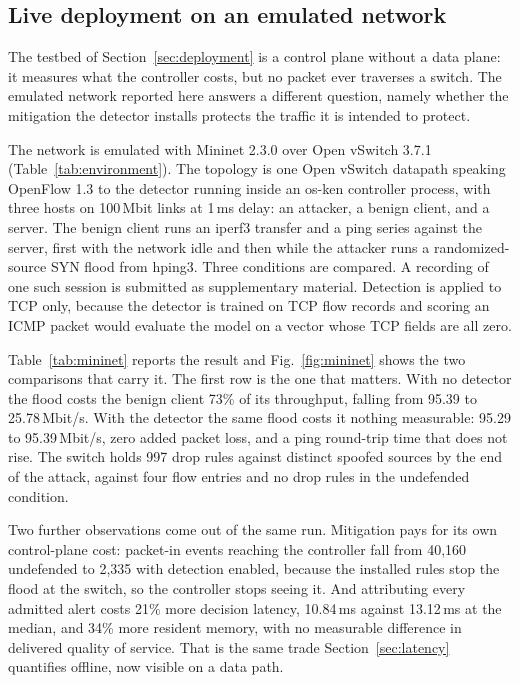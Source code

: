 \documentclass{ieeeaccess}
\begin{document}
\subsection{Live deployment on an emulated network}
\label{sec:mininet}
The testbed of Section~\ref{sec:deployment} is a control plane without a data
plane: it measures what the controller costs, but no packet ever traverses a
switch. The emulated network reported here answers a different question, namely
whether the mitigation the detector installs protects the traffic it is
intended to protect.

The network is emulated with Mininet 2.3.0 over Open vSwitch 3.7.1
(Table~\ref{tab:environment}). The topology is one Open vSwitch datapath speaking
OpenFlow 1.3 to the detector running inside an os-ken controller process, with
three hosts on 100\,Mbit links at 1\,ms delay: an attacker, a benign client, and
a server. The benign client runs an iperf3 transfer and a ping series against the
server, first with the network idle and then while the attacker runs a
randomized-source SYN flood from hping3. Three conditions are compared. A
recording of one such session is submitted as supplementary material. Detection is applied to TCP only, because the detector
is trained on TCP flow records and scoring an ICMP packet would evaluate the model
on a vector whose TCP fields are all zero.

Table~\ref{tab:mininet} reports the result and Fig.~\ref{fig:mininet} shows the
two comparisons that carry it. The first row is the one that
matters. With no detector the flood costs the benign client 73\% of its
throughput, falling from 95.39 to 25.78\,Mbit/s. With the detector the same flood
costs it nothing measurable: 95.29 to 95.39\,Mbit/s, zero added packet loss, and
a ping round-trip time that does not rise. The switch holds 997 drop rules
against distinct spoofed sources by the end of the attack, against four flow
entries and no drop rules in the undefended condition.

Two further observations come out of the same run. Mitigation pays for its own
control-plane cost: packet-in events reaching the controller fall from 40,160
undefended to 2,335 with detection enabled, because the installed rules stop the
flood at the switch, so the controller stops seeing it. And attributing every
admitted alert costs 21\% more decision latency, 10.84\,ms against 13.12\,ms at
the median, and 34\% more resident memory, with no measurable difference in
delivered quality of service. That is the same trade
Section~\ref{sec:latency} quantifies offline, now visible on a data path.
\end{document}

